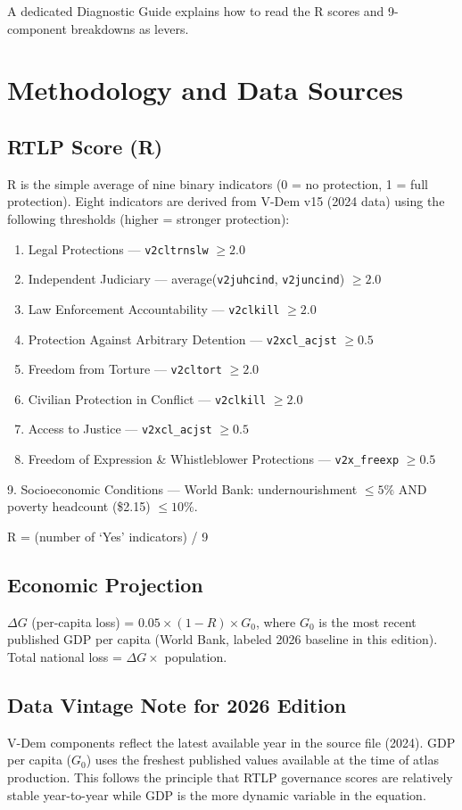 \documentclass[11pt,a4paper]{book}
\begin{document}
A dedicated Diagnostic Guide explains how to read the R scores and 9-component breakdowns as levers.


\chapter{Methodology and Data Sources}

\section{RTLP Score (R)}
R is the simple average of nine binary indicators (0 = no protection, 1 = full protection). Eight indicators are derived from V-Dem v15 (2024 data) using the following thresholds (higher = stronger protection):

\begin{enumerate}
  \item Legal Protections — \texttt{v2cltrnslw} $\ge 2.0$
  \item Independent Judiciary — average(\texttt{v2juhcind}, \texttt{v2juncind}) $\ge 2.0$
  \item Law Enforcement Accountability — \texttt{v2clkill} $\ge 2.0$
  \item Protection Against Arbitrary Detention — \texttt{v2xcl\_acjst} $\ge 0.5$
  \item Freedom from Torture — \texttt{v2cltort} $\ge 2.0$
  \item Civilian Protection in Conflict — \texttt{v2clkill} $\ge 2.0$
  \item Access to Justice — \texttt{v2xcl\_acjst} $\ge 0.5$
  \item Freedom of Expression \& Whistleblower Protections — \texttt{v2x\_freexp} $\ge 0.5$
\end{enumerate}

9. Socioeconomic Conditions — World Bank: undernourishment $\le 5\%$ AND poverty headcount (\$2.15) $\le 10\%$.

R = (number of `Yes' indicators) / 9

\section{Economic Projection}
$\Delta G$ (per-capita loss) = $0.05 \times (1 - R) \times G_0$, where $G_0$ is the most recent published GDP per capita (World Bank, labeled 2026 baseline in this edition). Total national loss = $\Delta G \times$ population.

\section{Data Vintage Note for 2026 Edition}
V-Dem components reflect the latest available year in the source file (2024). GDP per capita ($G_0$) uses the freshest published values available at the time of atlas production. This follows the principle that RTLP governance scores are relatively stable year-to-year while GDP is the more dynamic variable in the equation.
\end{document}
